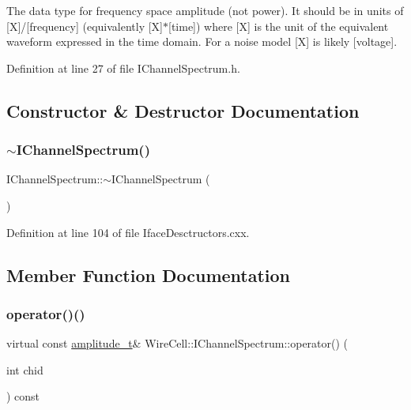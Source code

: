 The data type for frequency space amplitude (not power). It should be in units of \mbox{[}X\mbox{]}/\mbox{[}frequency\mbox{]} (equivalently \mbox{[}X\mbox{]}$\ast$\mbox{[}time\mbox{]}) where \mbox{[}X\mbox{]} is the unit of the equivalent waveform expressed in the time domain. For a noise model \mbox{[}X\mbox{]} is likely \mbox{[}voltage\mbox{]}. 

Definition at line 27 of file I\+Channel\+Spectrum.\+h.



\subsection{Constructor \& Destructor Documentation}
\mbox{\label{class_wire_cell_1_1_i_channel_spectrum_ad751811a830ad115e233604435209844}} 
\subsubsection{\texorpdfstring{$\sim$\+I\+Channel\+Spectrum()}{~IChannelSpectrum()}}
{\footnotesize\ttfamily I\+Channel\+Spectrum\+::$\sim$\+I\+Channel\+Spectrum (\begin{DoxyParamCaption}{ }\end{DoxyParamCaption})\hspace{0.3cm}{\ttfamily [virtual]}}



Definition at line 104 of file Iface\+Desctructors.\+cxx.



\subsection{Member Function Documentation}
\mbox{\label{class_wire_cell_1_1_i_channel_spectrum_a587c11bd2e39e3136b1b60268d22bf9f}} 
\subsubsection{\texorpdfstring{operator()()}{operator()()}}
{\footnotesize\ttfamily virtual const \hyperlink{class_wire_cell_1_1_i_channel_spectrum_a9af7bfed961f49dc8a532fd5d0bf3e6e}{amplitude\+\_\+t}\& Wire\+Cell\+::\+I\+Channel\+Spectrum\+::operator() (\begin{DoxyParamCaption}\item[{int}]{chid }\end{DoxyParamCaption}) const\hspace{0.3cm}{\ttfamily [pure virtual]}}

